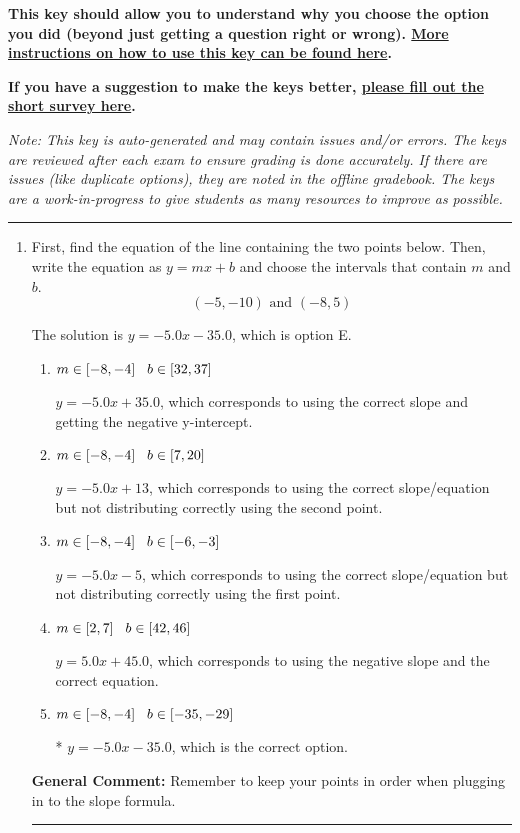 \documentclass{extbook}[14pt]
\newcommand{\litem}[1]{\item #1

\rule{\textwidth}{0.4pt}}
\begin{document}
\textbf{This key should allow you to understand why you choose the option you did (beyond just getting a question right or wrong). \href{https://xronos.clas.ufl.edu/mac1105spring2020/courseDescriptionAndMisc/Exams/LearningFromResults}{More instructions on how to use this key can be found here}.}

\textbf{If you have a suggestion to make the keys better, \href{https://forms.gle/CZkbZmPbC9XALEE88}{please fill out the short survey here}.}

\textit{Note: This key is auto-generated and may contain issues and/or errors. The keys are reviewed after each exam to ensure grading is done accurately. If there are issues (like duplicate options), they are noted in the offline gradebook. The keys are a work-in-progress to give students as many resources to improve as possible.}

\rule{\textwidth}{0.4pt}

\begin{enumerate}\litem{
First, find the equation of the line containing the two points below. Then, write the equation as $ y=mx+b $ and choose the intervals that contain $m$ and $b$.
\[ (-5, -10) \text{ and } (-8, 5) \]

The solution is \( y = -5.0x -35.0 \), which is option E.\begin{enumerate}[label=\Alph*.]
\item \( m \in [-8, -4] \hspace*{3mm} b \in [32, 37] \)

 $y = -5.0x + 35.0$, which corresponds to using the correct slope and getting the negative y-intercept.
\item \( m \in [-8, -4] \hspace*{3mm} b \in [7, 20] \)

 $y = -5.0x + 13$, which corresponds to using the correct slope/equation but not distributing correctly using the second point.
\item \( m \in [-8, -4] \hspace*{3mm} b \in [-6, -3] \)

 $y = -5.0x -5$, which corresponds to using the correct slope/equation but not distributing correctly using the first point.
\item \( m \in [2, 7] \hspace*{3mm} b \in [42, 46] \)

 $y = 5.0x + 45.0$, which corresponds to using the negative slope and the correct equation.
\item \( m \in [-8, -4] \hspace*{3mm} b \in [-35, -29] \)

* $y = -5.0x -35.0$, which is the correct option.
\end{enumerate}

\textbf{General Comment:} Remember to keep your points in order when plugging in to the slope formula.
}
\end{enumerate}
\end{document}
